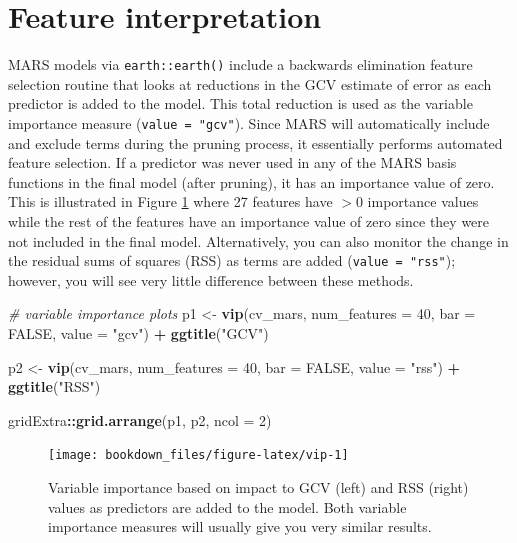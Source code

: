 \documentclass[]{krantz}
\makeatletter
\newenvironment{Shaded}{\begin{snugshade}}{\end{snugshade}}
\newcommand{\CommentTok}[1]{\textcolor[rgb]{0.37,0.37,0.37}{\textit{#1}}}
\newcommand{\DataTypeTok}[1]{\textcolor[rgb]{0.27,0.27,0.27}{#1}}
\newcommand{\DecValTok}[1]{\textcolor[rgb]{0.06,0.06,0.06}{#1}}
\newcommand{\KeywordTok}[1]{\textcolor[rgb]{0.27,0.27,0.27}{\textbf{#1}}}
\newcommand{\NormalTok}[1]{#1}
\newcommand{\OperatorTok}[1]{\textcolor[rgb]{0.43,0.43,0.43}{\textbf{#1}}}
\newcommand{\OtherTok}[1]{\textcolor[rgb]{0.37,0.37,0.37}{#1}}
\newcommand{\StringTok}[1]{\textcolor[rgb]{0.5,0.5,0.5}{#1}}
\newenvironment{kframe}{%
\medskip{}
\setlength{\fboxsep}{.8em}
 \def\at@end@of@kframe{}%
 \ifinner\ifhmode%
  \def\at@end@of@kframe{\end{minipage}}%
  \begin{minipage}{\columnwidth}%
 \fi\fi%
 \def\FrameCommand##1{\hskip\@totalleftmargin \hskip-\fboxsep
 \colorbox{shadecolor}{##1}\hskip-\fboxsep
     \hskip-\linewidth \hskip-\@totalleftmargin \hskip\columnwidth}%
 \MakeFramed {\advance\hsize-\width
   \@totalleftmargin\z@ \linewidth\hsize
   \@setminipage}}%
 {\par\unskip\endMakeFramed%
 \at@end@of@kframe}
\renewenvironment{Shaded}{\begin{kframe}}{\end{kframe}}
\makeatother
\begin{document}
\hypertarget{mars-features}{%
\section{Feature interpretation}\label{mars-features}}

MARS models via \texttt{earth::earth()} include a backwards elimination feature selection routine that looks at reductions in the GCV estimate of error as each predictor is added to the model. This total reduction is used as the variable importance measure (\texttt{value\ =\ "gcv"}). Since MARS will automatically include and exclude terms during the pruning process, it essentially performs automated feature selection. If a predictor was never used in any of the MARS basis functions in the final model (after pruning), it has an importance value of zero. This is illustrated in Figure \ref{fig:vip} where 27 features have \(>0\) importance values while the rest of the features have an importance value of zero since they were not included in the final model. Alternatively, you can also monitor the change in the residual sums of squares (RSS) as terms are added (\texttt{value\ =\ "rss"}); however, you will see very little difference between these methods.

\begin{Shaded}
\begin{Highlighting}[]
\CommentTok{# variable importance plots}
\NormalTok{p1 <-}\StringTok{ }\KeywordTok{vip}\NormalTok{(cv_mars, }\DataTypeTok{num_features =} \DecValTok{40}\NormalTok{, }\DataTypeTok{bar =} \OtherTok{FALSE}\NormalTok{, }\DataTypeTok{value =} \StringTok{"gcv"}\NormalTok{) }\OperatorTok{+}\StringTok{ }
\StringTok{  }\KeywordTok{ggtitle}\NormalTok{(}\StringTok{"GCV"}\NormalTok{)}

\NormalTok{p2 <-}\StringTok{ }\KeywordTok{vip}\NormalTok{(cv_mars, }\DataTypeTok{num_features =} \DecValTok{40}\NormalTok{, }\DataTypeTok{bar =} \OtherTok{FALSE}\NormalTok{, }\DataTypeTok{value =} \StringTok{"rss"}\NormalTok{) }\OperatorTok{+}\StringTok{ }
\StringTok{  }\KeywordTok{ggtitle}\NormalTok{(}\StringTok{"RSS"}\NormalTok{)}

\NormalTok{gridExtra}\OperatorTok{::}\KeywordTok{grid.arrange}\NormalTok{(p1, p2, }\DataTypeTok{ncol =} \DecValTok{2}\NormalTok{)}
\end{Highlighting}
\end{Shaded}

\begin{figure}

{\centering \texttt{[image: bookdown\_files/figure-latex/vip-1]} 

}

\caption{Variable importance based on impact to GCV (left) and RSS (right) values as predictors are added to the model. Both variable importance measures will usually give you very similar results.}\label{fig:vip}
\end{figure}
\end{document}

